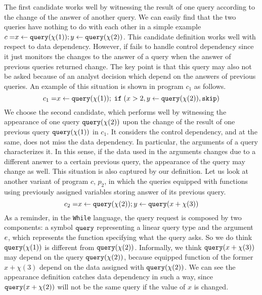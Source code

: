 {{
   The first candidate works well by witnessing the result of one query according to the change of the answer of another query. We can easily find that the two queries have nothing to do with each other in a simple example   
%
    $ c = \mathrel{ x \leftarrow {\tt query}(\chi(1)) } ; \mathrel{ y \leftarrow {\tt query}(\chi(2)) }$. This candidate definition works well with respect to data dependency. 
    However, if fails to handle control dependency since it just monitors the changes to the answer of a query when the answer of previous queries returned change. 
    The key point is that this query may also not be asked because of an analyst decision which depend on the answers of previous queries. 
    An example of this situation is shown in program $c_1$ as follows.
    \[
      c_1 = \mathrel{ x \leftarrow {\tt query}(\chi(1)) } ; \;\mathtt{if}\;( x > 2 ,\mathrel{ y \leftarrow {\tt query}(\chi(2)) }, \mathtt{skip} )
    \]
    We choose the second candidate, which performs well by witnessing the appearance of one query ${\tt query}(\chi(2))$ upon the change of the result of one previous query ${\tt query}(\chi(1))$ in $c_1$. 
    It considers the control dependency, and at the same, does not miss the data dependency.
    In particular, the arguments of a query characterizes it.
    In this sense, if the data used in the arguments changes due to a different answer to a certain previous query, the appearance of the query may change as well.
    This situation is also captured by our definition. 
    Let us look at another variant of program $c$, $p_2$, in which the queries equipped with functions using previously assigned variables storing answer of its previous query.
    \[
      c_2 = \mathrel{ x \leftarrow {\tt query}(\chi(2)) } ; \mathrel{ y \leftarrow {\tt query}(x+\chi(3)) }
    \]
    As a reminder, in the {\tt While} language, the query request is composed by two components: a symbol ${\tt query}$ representing a linear query type and the argument $e$, which represents the function specifying what the query asks. 
    So we do think ${\tt query}(\chi(1))$ is different from ${\tt query}(\chi(2))$.
    Informally, we think ${\tt query}(x+\chi(3))$ may depend on the query ${\tt query}(\chi(2))$, because equipped function of the former $x+\chi(3)$ depend on the data assigned with ${\tt query}(\chi(2))$.
    We can see the appearance definition catches data dependency in such a way, 
    since ${\tt query}(x+\chi(2))$ will not be the same query if the value of $x$ is changed.    
}

}

